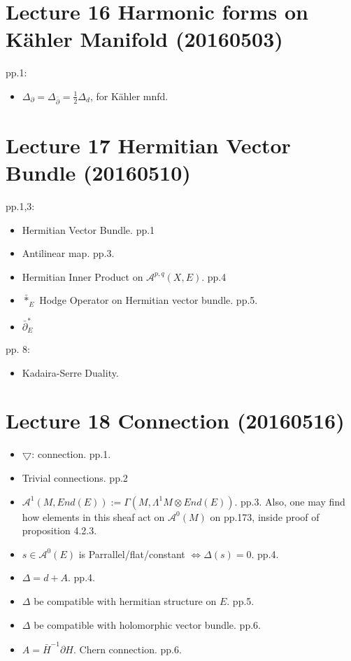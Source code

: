 \documentclass{book}
\numberwithin{equation}{subsection} %
\theoremstyle{definition}
\begin{document}
\section{Lecture 16 Harmonic forms on K\"{a}hler Manifold (20160503)}

pp.1:
\begin{itemize}
    \item $\Delta_\partial = \Delta_{\bar{\partial}} = 
        \frac{1}{2}\Delta_d$, for K\"{a}hler mnfd.
\end{itemize}

\section{Lecture 17 Hermitian Vector Bundle (20160510)}
pp.1,3:
\begin{itemize}
    \item Hermitian Vector Bundle. pp.1
    \item Antilinear map. pp.3.
    \item Hermitian Inner Product on $\mathcal{A}^{p,q}(X,E)$. pp.4
    \item $\bar{*}_E$ Hodge Operator on Hermitian vector bundle. pp.5.
    \item $\bar{\partial}_E^*$
\end{itemize}
pp. 8:
\begin{itemize}
    \item Kadaira-Serre Duality.
\end{itemize}

\section{Lecture 18 Connection (20160516)}
\begin{itemize}
    \item $\bigtriangledown$: connection. pp.1.
    \item Trivial connections. pp.2
    \item $\mathcal{A}^1(M,End(E)):=\Gamma(M,\Lambda^1 M\otimes End(E))$. pp.3. Also, one may find how elements in this sheaf act on $\mathcal{A}^0(M)$ on pp.173, inside proof of proposition 4.2.3.
    \item $s\in \mathcal{A}^0(E)$ is Parrallel/flat/constant $\Leftrightarrow \Delta(s) = 0$. pp.4.
    \item $\Delta = d+A$. pp.4.
    \item $\Delta$ be compatible with hermitian structure on $E$. pp.5.
    \item $\Delta$ be compatible with holomorphic vector bundle. pp.6.
    \item $A=\bar{H}^{-1} \partial H$. Chern connection. pp.6.
\end{itemize}
\end{document}
